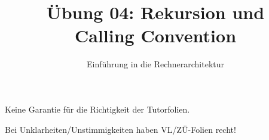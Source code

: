 

\title{Übung 04: Rekursion und \\Calling Convention}
\subtitle{Einführung in die Rechnerarchitektur}
\date{}



\maketitle

\begin{frame}[c, fragile]{}{}
	\begin{center}
		\LARGE  Keine Garantie für die Richtigkeit der Tutorfolien.

		\Large Bei Unklarheiten/Unstimmigkeiten haben VL/ZÜ-Folien recht!
	\end{center}
\end{frame}


